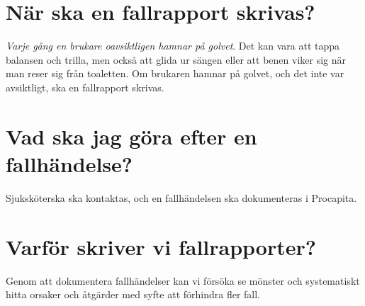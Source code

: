 \documentclass[paper=a5,DIV=15,headinclude,twoside=semi,openany,titlepage=firstiscover]{scrbook}
\begin{document}
\begin{titlepage}
\end{titlepage}

\mainmatter
\pagestyle{empty}

\section*{När ska en fallrapport skrivas?}
\textit{Varje gång en brukare oavsiktligen hamnar på golvet}. Det kan vara att tappa balansen och trilla, men också att glida ur sängen eller att benen viker sig när man reser sig från toaletten. Om brukaren hamnar på golvet, och det inte var avsiktligt, ska en fallrapport skrivas.

\section*{Vad ska jag göra efter en fallhändelse?}
Sjuksköterska ska kontaktas, och en fallhändelsen ska dokumenteras i Procapita.

\section*{Varför skriver vi fallrapporter?}
Genom att dokumentera fallhändelser kan vi försöka se mönster och systematiskt hitta orsaker och åtgärder med syfte att förhindra fler fall. 

\clearpage
\end{document}
